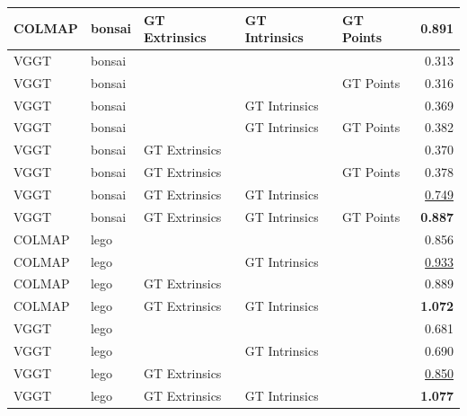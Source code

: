 \begin{table}[H]
\begin{tabular}{lllllr}
COLMAP & bonsai & GT Extrinsics & GT Intrinsics & GT Points & \textbf{0.891} \\
\midrule
VGGT & bonsai &  &  &  & 0.313 \\
VGGT & bonsai &  &  & GT Points & 0.316 \\
VGGT & bonsai &  & GT Intrinsics &  & 0.369 \\
VGGT & bonsai &  & GT Intrinsics & GT Points & 0.382 \\
VGGT & bonsai & GT Extrinsics &  &  & 0.370 \\
VGGT & bonsai & GT Extrinsics &  & GT Points & 0.378 \\
VGGT & bonsai & GT Extrinsics & GT Intrinsics &  & \underline{0.749} \\
VGGT & bonsai & GT Extrinsics & GT Intrinsics & GT Points & \textbf{0.887} \\
\midrule
COLMAP & lego &  &  &  & 0.856 \\
COLMAP & lego &  & GT Intrinsics &  & \underline{0.933} \\
COLMAP & lego & GT Extrinsics &  &  & 0.889 \\
COLMAP & lego & GT Extrinsics & GT Intrinsics &  & \textbf{1.072} \\
\midrule
VGGT & lego &  &  &  & 0.681 \\
VGGT & lego &  & GT Intrinsics &  & 0.690 \\
VGGT & lego & GT Extrinsics &  &  & \underline{0.850} \\
VGGT & lego & GT Extrinsics & GT Intrinsics &  & \textbf{1.077} \\
\bottomrule
\end{tabular}
\end{table}